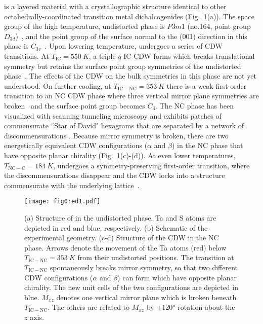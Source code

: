\tastwo is a layered material with a crystallographic structure identical to other octahedrally-coordinated transition metal dichalcogenides (Fig.~\ref{fig:fig0}(a)).
The space group of the high temperature, undistorted phase is $P\bar{3}m1$ (no.164, point group $D_{3d}$)~\cite{spijkerman_x-ray_1997}, and the point group of the surface normal to the (001) direction in this phase is $C_{3v}$~\cite{scruby_role_1975, fung_application_1980}.
Upon lowering temperature, \tastwo undergoes a series of CDW transitions.
At $T_{\mathrm{IC}}=\qty{550}{K}$, a triple-$q$ IC CDW forms which breaks translational symmetry but retains the surface point group symmetries of the undistorted phase~\cite{scruby_role_1975, fung_application_1980}.
The effects of the CDW on the bulk symmetries in this phase are not yet understood.
On further cooling, at $T_{\mathrm{IC-NC}}=\qty{353}{K}$ there is a weak first-order transition to an NC CDW phase where three vertical mirror plane symmetries are broken~\cite{spijkerman_x-ray_1997} and the surface point group becomes $C_3$.
The NC phase has been visualized with scanning tunneling microscopy and exhibits patches of commensurate ``Star of David" hexagrams that are separated by a network of discommensurations \cite{wu_hexagonal_1989}.
Because mirror symmetry is broken, there are two energetically equivalent CDW configurations ($\alpha$ and $\beta$) in the NC phase that have opposite planar chirality (Fig.~\ref{fig:fig0}(c)-(d)).
At even lower temperatures, $T_{\mathrm{NC-C}}=\qty{184}{K}$, \tastwo undergoes a symmetry-preserving first-order transition, where the discommensurations disappear and the CDW locks into a structure commensurate with the underlying lattice~\cite{ishiguro_high-resolution_1995}.

\begin{figure}
\texttt{[image: fig0red1.pdf]}%
\caption{\label{fig:fig0}
(a) Structure of \tastwo in the undistorted phase. 
Ta and S atoms are depicted in red and blue, respectively. 
(b) Schematic of the experimental geometry.
(c-d) Structure of the CDW in the NC phase.
Arrows denote the movement of the Ta atoms (red) below $T_\mathrm{IC-NC}=\qty{353}{K}$ from their undistorted positions.
The transition at $T_{\mathrm{IC-NC}}$ spontaneously breaks mirror symmetry, so that two different CDW configurations ($\alpha$ and $\beta$) can form which have opposite planar chirality.
The new unit cells of the two configurations are depicted in blue.
$M_{xz}$ denotes one vertical mirror plane which is broken beneath $T_\mathrm{IC-NC}$.
The others are related to $M_{xz}$ by $\pm \ang{120}$ rotation about the $z$ axis.}
\end{figure}

